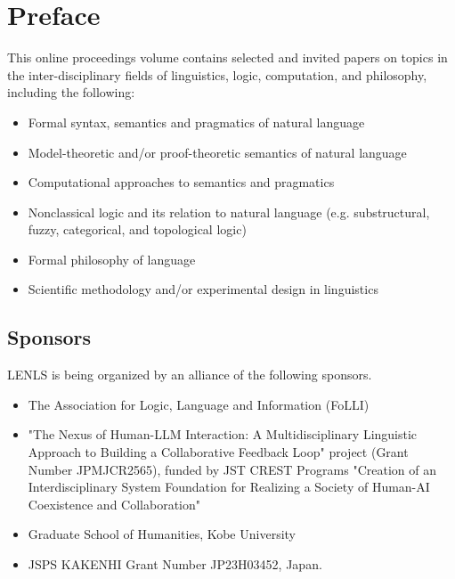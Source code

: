 \documentclass[12pt]{ltjarticle}
\begin{document}
\newpage

\vspace*{20cm}
\vfill
\begin{large}

\end{large}

\newpage
\pagestyle{plain}

\newpage
\section*{Preface}
This online proceedings volume contains selected and invited papers on topics in the inter-disciplinary fields of linguistics, logic, computation, and philosophy, including the following:
\begin{itemize}
\item[$\maltese$] Formal syntax, semantics and pragmatics of natural language
\item[$\maltese$] Model-theoretic and/or proof-theoretic semantics of natural language
\item[$\maltese$] Computational approaches to semantics and pragmatics
\item[$\maltese$] Nonclassical logic and its relation to natural language 
  (e.g. substructural, fuzzy, categorical, and topological logic)
\item[$\maltese$] Formal philosophy of language
\item[$\maltese$] Scientific methodology and/or experimental design in linguistics
\end{itemize}

\subsection*{Sponsors}
LENLS is being organized by an alliance of the following sponsors.
\begin{itemize}
\item The Association for Logic, Language and Information (FoLLI)
\item "The Nexus of Human-LLM Interaction: A Multidisciplinary Linguistic Approach to Building a Collaborative Feedback Loop" project (Grant Number JPMJCR2565), funded by JST CREST Programs "Creation of an Interdisciplinary System Foundation for Realizing a Society of Human-AI Coexistence and Collaboration"
\item Graduate School of Humanities, Kobe University
\item JSPS KAKENHI Grant Number JP23H03452, Japan.
\end{itemize}
\end{document}
